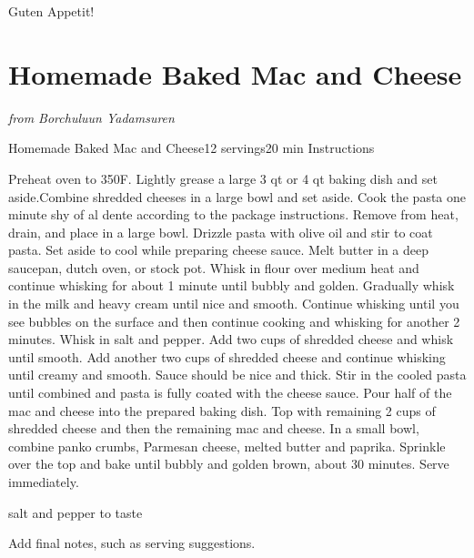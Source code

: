 \documentclass[openany]{book}
\begin{document}
Guten Appetit!

\chapter{Homemade Baked Mac and
Cheese}\label{homemade-baked-mac-and-cheese}

\emph{from Borchuluun Yadamsuren}

\begin{recipe}{Homemade Baked Mac and Cheese}{12 servings}{20 min}
\freeform
Instructions

Preheat oven to 350F. Lightly grease a large 3 qt or 4 qt baking dish and set aside.Combine shredded cheeses in a large bowl and set aside.
Cook the pasta one minute shy of al dente according to the package instructions. Remove from heat, drain, and place in a large bowl.
Drizzle pasta with olive oil and stir to coat pasta. Set aside to cool while preparing cheese sauce.
Melt butter in a deep saucepan, dutch oven, or stock pot.
Whisk in flour over medium heat and continue whisking for about 1 minute until bubbly and golden.
Gradually whisk in the milk and heavy cream until nice and smooth. Continue whisking until you see bubbles on the surface and then continue cooking and whisking for another 2 minutes. Whisk in salt and pepper.
Add two cups of shredded cheese and whisk until smooth. Add another two cups of shredded cheese and continue whisking until creamy and smooth. Sauce should be nice and thick.
Stir in the cooled pasta until combined and pasta is fully coated with the cheese sauce.
Pour half of the mac and cheese into the prepared baking dish. Top with remaining 2 cups of shredded cheese and then the remaining mac and cheese.
In a small bowl, combine panko crumbs, Parmesan cheese, melted butter and paprika. Sprinkle over the top and bake until bubbly and golden brown, about 30 minutes. Serve immediately.

salt and pepper to taste

\freeform Add final notes, such as serving suggestions.
\end{recipe}
\end{document}
